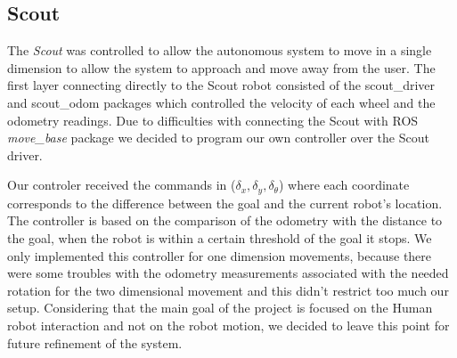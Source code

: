 \subsection{Scout}
The \textit{Scout} was controlled to allow the autonomous system to move in a single dimension to allow the system to approach and move away from the user.
The first layer connecting directly to the Scout robot consisted of the scout\_driver and scout\_odom packages which controlled the velocity of each wheel and the odometry readings.  
Due to difficulties with connecting the Scout with ROS \textit{move\_base} package we decided to program our own controller over the Scout driver. 

Our controler received the commands in ($\delta_x,\delta_y,\delta_\theta$) where each coordinate corresponds to the difference between the goal and the current robot's location. The controller is based on the comparison of the odometry with the distance to the goal, when the robot is within a certain threshold of the goal it stops. We only implemented this controller for one dimension movements, because there were some troubles with the odometry measurements associated with the needed rotation for the two dimensional movement and this didn't restrict too much our setup. Considering that the main goal of the project is focused on the Human robot interaction and not on the robot motion, we decided to leave this point for future refinement of the system.\\

	






